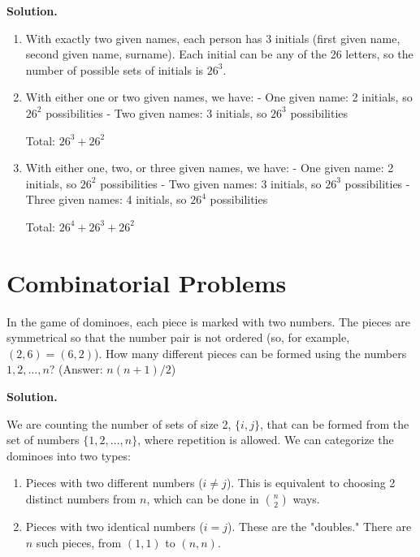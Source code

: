 \noindent\textbf{Solution.}
\begin{enumerate}[label=(\alph*)]
    \item With exactly two given names, each person has 3 initials (first given name, second given name, surname). Each initial can be any of the 26 letters, so the number of possible sets of initials is $26^3$.
    
    \item With either one or two given names, we have:
    - One given name: 2 initials, so $26^2$ possibilities
    - Two given names: 3 initials, so $26^3$ possibilities
    
    Total: $26^3 + 26^2$
    
    \item With either one, two, or three given names, we have:
    - One given name: 2 initials, so $26^2$ possibilities
    - Two given names: 3 initials, so $26^3$ possibilities
    - Three given names: 4 initials, so $26^4$ possibilities
    
    Total: $26^4 + 26^3 + 26^2$
\end{enumerate}


\section{Combinatorial Problems}

\begin{problembox}
In the game of dominoes, each piece is marked with two numbers. The pieces are symmetrical so that the number pair is not ordered (so, for example, $(2,6)=(6,2)$). How many different pieces can be formed using the numbers $1,2,\ldots,n$?
(Answer: $n(n+1)/2$)
\end{problembox}

\noindent\textbf{Solution.}

We are counting the number of sets of size 2, $\{i, j\}$, that can be formed from the set of numbers $\{1, 2, \ldots, n\}$, where repetition is allowed. We can categorize the dominoes into two types:

\begin{enumerate}
    \item Pieces with two different numbers ($i \neq j$). This is equivalent to choosing 2 distinct numbers from $n$, which can be done in $\binom{n}{2}$ ways.
    \item Pieces with two identical numbers ($i = j$). These are the "doubles." There are $n$ such pieces, from $(1,1)$ to $(n,n)$.
\end{enumerate}

